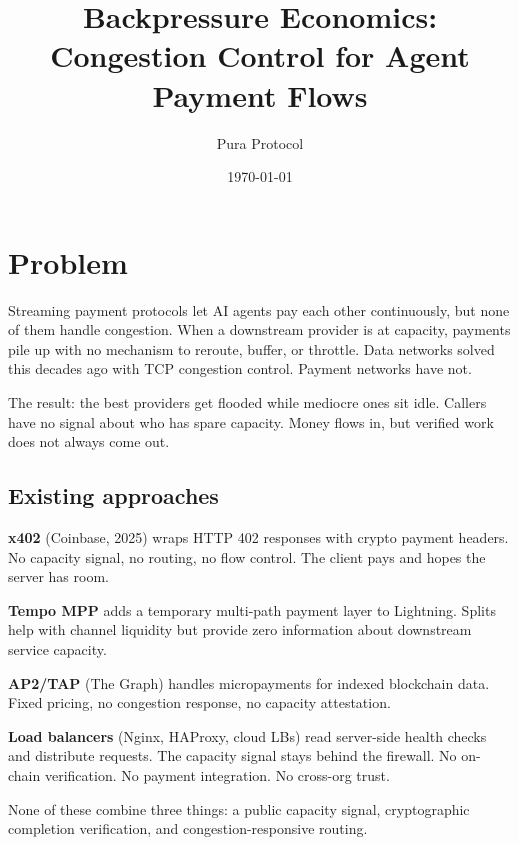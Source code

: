 \documentclass[10pt,twocolumn]{article}
\title{Backpressure Economics:\\
Congestion Control for Agent Payment Flows}
\author{Pura Protocol}
\date{\today}
\begin{document}
\maketitle
\thispagestyle{empty}


\section{Problem}

Streaming payment protocols let AI agents pay each other continuously, but none
of them handle congestion. When a downstream provider is at capacity, payments
pile up with no mechanism to reroute, buffer, or throttle. Data networks solved
this decades ago with TCP congestion control. Payment networks have not.

The result: the best providers get flooded while mediocre ones sit idle. Callers
have no signal about who has spare capacity. Money flows in, but verified work
does not always come out.

\subsection{Existing approaches}

\textbf{x402} (Coinbase, 2025) wraps HTTP 402 responses with crypto payment
headers. No capacity signal, no routing, no flow control. The client pays and
hopes the server has room.

\textbf{Tempo MPP} adds a temporary multi-path payment layer to Lightning.
Splits help with channel liquidity but provide zero information about
downstream service capacity.

\textbf{AP2/TAP} (The Graph) handles micropayments for indexed blockchain data.
Fixed pricing, no congestion response, no capacity attestation.

\textbf{Load balancers} (Nginx, HAProxy, cloud LBs) read server-side health
checks and distribute requests. The capacity signal stays behind the firewall.
No on-chain verification. No payment integration. No cross-org trust.

None of these combine three things: a public capacity signal, cryptographic
completion verification, and congestion-responsive routing.

\end{document}
